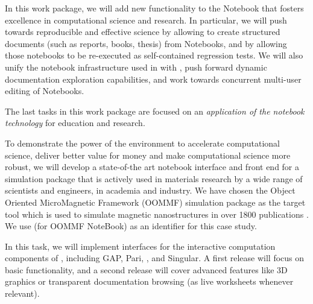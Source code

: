 \begin{workpackage}
\begin{wpdescription}
  In this work package, we will add new functionality to the \Jupyter
  Notebook that fosters excellence in computational science and
  research. In particular, we will push towards reproducible and
  effective science by allowing to create structured documents (such
  as reports, books, thesis) from Notebooks, and by allowing those
  notebooks to be re-executed as self-contained regression tests. We
  will also unify the notebook infrastructure used in \Sage with
  \Jupyter, push forward dynamic documentation exploration
  capabilities, and work towards concurrent multi-user editing of
  Notebooks.

  The last tasks in this work package are focused on an
  \emph{application of the \Jupyter notebook technology} for education
  and research.


  To demonstrate the power of the \Jupyter {} environment to
  accelerate computational science, deliver better value for money and
  make computational science more robust, we will develop a
  state-of-the art \Jupyter notebook interface and front end for a
  simulation package that is actively used in materials research by a
  wide range of scientists and engineers, in academia and industry. We
  have chosen the Object Oriented MicroMagnetic Framework (OOMMF)
  simulation package \cite{OOMMF-url} as the target tool which is used
  to simulate magnetic nanostructures in over 1800 publications
  \cite{OOMMF-citations-url}. We use \OOMMFNB{} (for OOMMF NoteBook)
  as an identifier for this case study.
\end{wpdescription}

\begin{tasklist}
\begin{task}[title=Uniform notebook interface for all interactive components,id=ipython-kernels]
  In this task, we will implement \Jupyter interfaces for the
  interactive computation components of \TheProject, including GAP,
  Pari, \Sage, and Singular. A first release
   will focus on basic functionality,
  and a second release  will cover advanced
  features like 3D graphics or transparent documentation browsing (as
  live worksheets whenever relevant).



\end{task}
\end{tasklist}
\end{workpackage}
